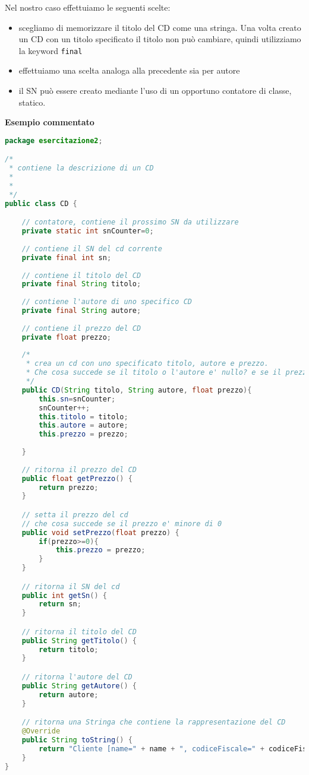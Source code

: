 \documentclass{article}
\begin{document}
Nel nostro caso effettuiamo le seguenti scelte:
\begin{itemize}
\item scegliamo di memorizzare il titolo del CD come una stringa. Una volta creato un CD con un titolo specificato il titolo non pu\`o cambiare, quindi utilizziamo la keyword \texttt{final}
\item effettuiamo una scelta analoga alla precedente sia per autore
\item il SN pu\`o essere creato mediante l'uso di un opportuno contatore di classe, statico. 
\end{itemize}

\textbf{Esempio commentato}
\begin{lstlisting}[language=Java,escapechar=|]
package esercitazione2;

/*
 * contiene la descrizione di un CD
 * 
 *
 */
public class CD {

	// contatore, contiene il prossimo SN da utilizzare
	private static int snCounter=0;
	
	// contiene il SN del cd corrente
	private final int sn;
	
	// contiene il titolo del CD
	private final String titolo;
	
	// contiene l'autore di uno specifico CD
	private final String autore;
	
	// contiene il prezzo del CD
	private float prezzo;
	
	/*
	 * crea un cd con uno specificato titolo, autore e prezzo.
	 * Che cosa succede se il titolo o l'autore e' nullo? e se il prezzo e' minore di 0?
	 */
	public CD(String titolo, String autore, float prezzo){
		this.sn=snCounter;
		snCounter++;
		this.titolo = titolo;
		this.autore = autore;
		this.prezzo = prezzo;
		
	}
	
	// ritorna il prezzo del CD
	public float getPrezzo() {
		return prezzo;
	}

	// setta il prezzo del cd
	// che cosa succede se il prezzo e' minore di 0
	public void setPrezzo(float prezzo) {
	    if(prezzo>=0){
			this.prezzo = prezzo;
	    }
	}

	// ritorna il SN del cd
	public int getSn() {
		return sn;
	}

	// ritorna il titolo del CD
	public String getTitolo() {
		return titolo;
	}

	// ritorna l'autore del CD
	public String getAutore() {
		return autore;
	}

	// ritorna una Stringa che contiene la rappresentazione del CD 
	@Override
	public String toString() {
		return "Cliente [name=" + name + ", codiceFiscale=" + codiceFiscale+ "]";
	}
}
\end{lstlisting}
\end{document}
